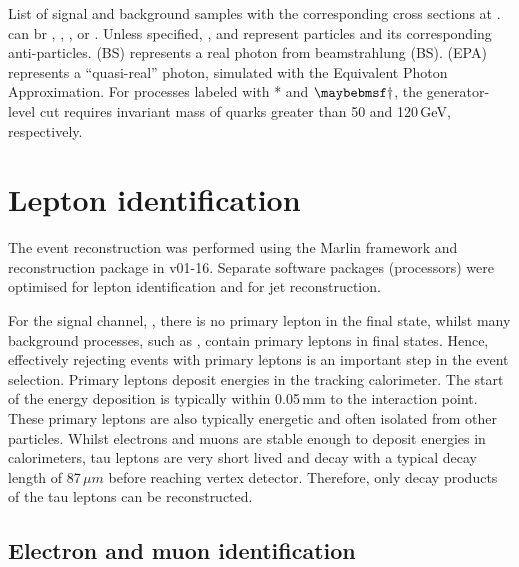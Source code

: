 \begin{table}[!tbp]
\caption[Signal and background samples with the corresponding cross sections at .]{List of signal and background samples with the corresponding cross sections at . \Pquark can br \Pup, \Pdown, \Pstrange, \Pbottom or \Ptop. Unless specified, \Pquark, \Plepton and \Pnu represent particles and its corresponding anti-particles. \Pphoton(BS) represents a real photon from beamstrahlung (BS). \Pphoton(EPA) represents a ``quasi-real'' photon, simulated with the Equivalent Photon Approximation. For processes labeled with * and $\myDagger$, the generator-level cut requires invariant mass of quarks greater than 50 and 120\,GeV, respectively.}
\label{tab:doubleHiggsMCSamples}
\end{table}

\section{Lepton identification}
\label{sec:doubleHiggsLepton}

The event reconstruction was performed using the Marlin framework and reconstruction package in \ilcsoft v01-16. Separate software packages (processors) were optimised for lepton identification and for jet reconstruction. %


For the signal channel, \eeToHHbbWWHad, there is no primary lepton in the final state, whilst many background  processes, such as \HepProcess{\Pquark \Pquark \Pquark \Pquark \Plepton \Pnu}, contain primary leptons in final states. Hence, effectively rejecting events with primary leptons is an important step in the event selection. Primary leptons deposit energies in the tracking calorimeter. The start of the energy deposition is typically within 0.05\,mm to the interaction point. These primary leptons are also typically energetic and often isolated from other particles. Whilst electrons and muons are stable enough to deposit energies in calorimeters, tau leptons are very short lived and decay with a typical decay length of 87\,$\mu{m}$ before reaching vertex detector. Therefore, only decay products of the tau leptons can be reconstructed.

\subsection{Electron and muon identification}
\label{sec:doubleHiggsLeptonID}

